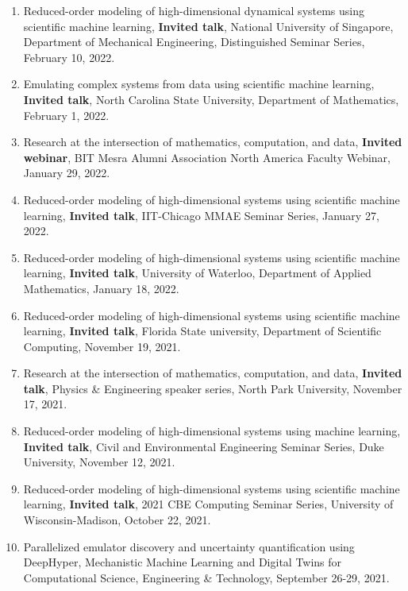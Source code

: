 \documentclass[letterpaper]{article}
\begin{document}
\begin{enumerate}
\item Reduced-order modeling of high-dimensional dynamical systems using scientific machine learning, \textbf{Invited talk}, National University of Singapore, Department of Mechanical Engineering, Distinguished Seminar Series, February 10, 2022.

\item Emulating complex systems from data using scientific machine learning, \textbf{Invited talk}, North Carolina State University, Department of Mathematics, February 1, 2022.

\item Research at the intersection of mathematics, computation, and data, \textbf{Invited webinar}, BIT Mesra Alumni Association North America Faculty Webinar, January 29, 2022.

\item Reduced-order modeling of high-dimensional systems using scientific machine learning, \textbf{Invited talk}, IIT-Chicago MMAE Seminar Series, January 27, 2022.

\item Reduced-order modeling of high-dimensional systems using scientific machine learning, \textbf{Invited talk}, University of Waterloo, Department of Applied Mathematics, January 18, 2022.

\item Reduced-order modeling of high-dimensional systems using scientific machine learning, \textbf{Invited talk}, Florida State university, Department of Scientific Computing, November 19, 2021.

\item Research at the intersection of mathematics, computation, and data, \textbf{Invited talk}, Physics \& Engineering speaker series, North Park University, November 17, 2021.

\item Reduced-order modeling of high-dimensional systems using machine learning, \textbf{Invited talk}, Civil and Environmental Engineering Seminar Series, Duke University, November 12, 2021.

\item Reduced-order modeling of high-dimensional systems using scientific machine learning, \textbf{Invited talk}, 2021 CBE Computing Seminar Series, University of Wisconsin-Madison, October 22, 2021.

\item Parallelized emulator discovery and uncertainty quantification using DeepHyper, Mechanistic Machine Learning and Digital Twins for Computational Science, Engineering \& Technology, September 26-29, 2021.


\end{enumerate}
\end{document}
